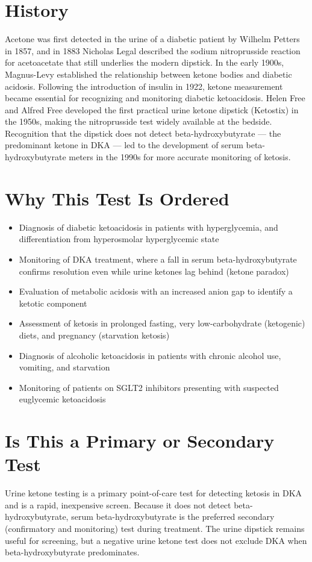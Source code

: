 \section*{History}
Acetone was first detected in the urine of a diabetic patient by Wilhelm Petters in 1857, and in 1883 Nicholas Legal described the sodium nitroprusside reaction for acetoacetate that still underlies the modern dipstick. In the early 1900s, Magnus-Levy established the relationship between ketone bodies and diabetic acidosis. Following the introduction of insulin in 1922, ketone measurement became essential for recognizing and monitoring diabetic ketoacidosis. Helen Free and Alfred Free developed the first practical urine ketone dipstick (Ketostix) in the 1950s, making the nitroprusside test widely available at the bedside. Recognition that the dipstick does not detect beta-hydroxybutyrate --- the predominant ketone in DKA --- led to the development of serum beta-hydroxybutyrate meters in the 1990s for more accurate monitoring of ketosis.
\section*{Why This Test Is Ordered}
\begin{itemize}
  \item Diagnosis of diabetic ketoacidosis in patients with hyperglycemia, and differentiation from hyperosmolar hyperglycemic state
  \item Monitoring of DKA treatment, where a fall in serum beta-hydroxybutyrate confirms resolution even while urine ketones lag behind (ketone paradox)
  \item Evaluation of metabolic acidosis with an increased anion gap to identify a ketotic component
  \item Assessment of ketosis in prolonged fasting, very low-carbohydrate (ketogenic) diets, and pregnancy (starvation ketosis)
  \item Diagnosis of alcoholic ketoacidosis in patients with chronic alcohol use, vomiting, and starvation
  \item Monitoring of patients on SGLT2 inhibitors presenting with suspected euglycemic ketoacidosis
\end{itemize}
\section*{Is This a Primary or Secondary Test}
Urine ketone testing is a primary point-of-care test for detecting ketosis in DKA and is a rapid, inexpensive screen. Because it does not detect beta-hydroxybutyrate, serum beta-hydroxybutyrate is the preferred secondary (confirmatory and monitoring) test during treatment. The urine dipstick remains useful for screening, but a negative urine ketone test does not exclude DKA when beta-hydroxybutyrate predominates.
